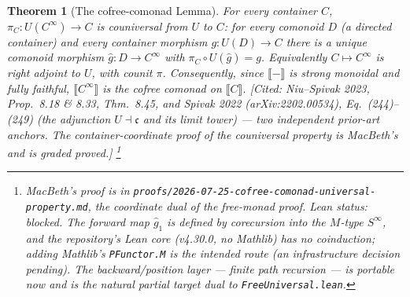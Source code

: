 \documentclass[11pt,a4paper]{book}
\newcommand{\Ext}[1]{\llbracket #1 \rrbracket}
\theoremstyle{plain}
\newtheorem{Theorem}{Theorem}[chapter]
\theoremstyle{definition}
\theoremstyle{remark}
\newcommand{\prov}[1]{\hfill\textsf{\footnotesize[#1]}}
\begin{document}
\begin{Theorem}[The cofree-comonad Lemma]\label{thm:cofree-lemma}
For every container $C$, $\pi_{C}\colon U(C^{\infty})\to C$ is couniversal from $U$ to $C$: for
every comonoid $D$ (a directed container) and every container morphism $g\colon U(D)\to C$ there
is a \emph{unique} comonoid morphism $\widehat g\colon D\to C^{\infty}$ with
$\pi_{C}\circ U(\widehat g)=g$. Equivalently $C\mapsto C^{\infty}$ is right adjoint to $U$, with
counit $\pi$. Consequently, since $\Ext{-}$ is strong monoidal and fully faithful,
$\Ext{C^{\infty}}$ is the cofree comonad on $\Ext C$.
\prov{Cited: Niu--Spivak 2023, Prop.\ 8.18 \& 8.33, Thm.\ 8.45, and Spivak 2022
(arXiv:2202.00534), Eq.\ (244)--(249) (the adjunction $U\dashv\mathfrak c$ and its limit tower)
--- two independent prior-art anchors. The container-coordinate proof of the couniversal
property is MacBeth's and is graded \emph{proved}.}%
\footnote{MacBeth's proof is in \texttt{proofs/2026-07-25-cofree-comonad-universal-property.md},
the coordinate dual of the free-monad proof. \emph{Lean status: blocked.} The forward map
$\widehat g_{1}$ is defined by corecursion into the $M$-type $S^{\infty}$, and the
repository's Lean core (v4.30.0, no Mathlib) has no coinduction; adding Mathlib's
\texttt{PFunctor.M} is the intended route (an infrastructure decision pending). The
\emph{backward/position} layer --- finite path recursion --- is portable now and is the natural
partial target dual to \texttt{FreeUniversal.lean}.}
\end{Theorem}
\end{document}
